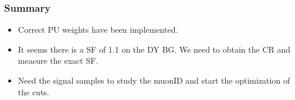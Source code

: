 \documentclass{beamer}
\begin{document}
 
 \begin{frame}
  \frametitle{Summary}
  \begin{itemize}
  \item Correct PU weights have been implemented.
  \item It seems there is a SF of 1.1 on the DY BG. We need to obtain the CR and measure the exact SF.
   \item Need the signal samples to study the muonID and start the optimization of the cuts.
  \end{itemize}
 \end{frame}
 
\end{document}
